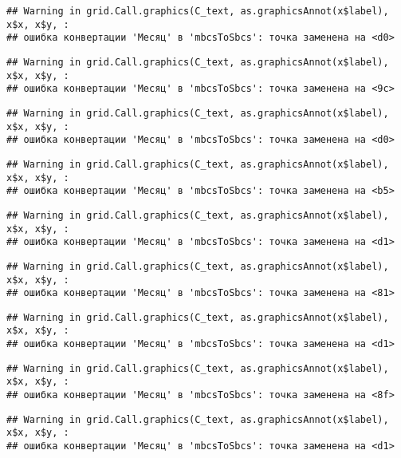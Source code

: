 \documentclass[
]{article}
\begin{document}
\begin{verbatim}
## Warning in grid.Call.graphics(C_text, as.graphicsAnnot(x$label), x$x, x$y, :
## ошибка конвертации 'Месяц' в 'mbcsToSbcs': точка заменена на <d0>
\end{verbatim}

\begin{verbatim}
## Warning in grid.Call.graphics(C_text, as.graphicsAnnot(x$label), x$x, x$y, :
## ошибка конвертации 'Месяц' в 'mbcsToSbcs': точка заменена на <9c>
\end{verbatim}

\begin{verbatim}
## Warning in grid.Call.graphics(C_text, as.graphicsAnnot(x$label), x$x, x$y, :
## ошибка конвертации 'Месяц' в 'mbcsToSbcs': точка заменена на <d0>
\end{verbatim}

\begin{verbatim}
## Warning in grid.Call.graphics(C_text, as.graphicsAnnot(x$label), x$x, x$y, :
## ошибка конвертации 'Месяц' в 'mbcsToSbcs': точка заменена на <b5>
\end{verbatim}

\begin{verbatim}
## Warning in grid.Call.graphics(C_text, as.graphicsAnnot(x$label), x$x, x$y, :
## ошибка конвертации 'Месяц' в 'mbcsToSbcs': точка заменена на <d1>
\end{verbatim}

\begin{verbatim}
## Warning in grid.Call.graphics(C_text, as.graphicsAnnot(x$label), x$x, x$y, :
## ошибка конвертации 'Месяц' в 'mbcsToSbcs': точка заменена на <81>
\end{verbatim}

\begin{verbatim}
## Warning in grid.Call.graphics(C_text, as.graphicsAnnot(x$label), x$x, x$y, :
## ошибка конвертации 'Месяц' в 'mbcsToSbcs': точка заменена на <d1>
\end{verbatim}

\begin{verbatim}
## Warning in grid.Call.graphics(C_text, as.graphicsAnnot(x$label), x$x, x$y, :
## ошибка конвертации 'Месяц' в 'mbcsToSbcs': точка заменена на <8f>
\end{verbatim}

\begin{verbatim}
## Warning in grid.Call.graphics(C_text, as.graphicsAnnot(x$label), x$x, x$y, :
## ошибка конвертации 'Месяц' в 'mbcsToSbcs': точка заменена на <d1>
\end{verbatim}
\end{document}

